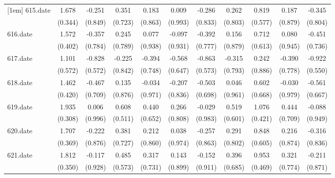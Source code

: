\begin{tabular}{l*{10}{c}}
[1em]
615.date    &       1.678&      -0.251&       0.351&       0.183&       0.009&      -0.286&       0.262&       0.819&       0.187&      -0.345\\
            &     (0.344)&     (0.849)&     (0.723)&     (0.863)&     (0.993)&     (0.833)&     (0.803)&     (0.577)&     (0.879)&     (0.804)\\
[1em]
616.date    &       1.572&      -0.357&       0.245&       0.077&      -0.097&      -0.392&       0.156&       0.712&       0.080&      -0.451\\
            &     (0.402)&     (0.784)&     (0.789)&     (0.938)&     (0.931)&     (0.777)&     (0.879)&     (0.613)&     (0.945)&     (0.736)\\
[1em]
617.date    &       1.101&      -0.828&      -0.225&      -0.394&      -0.568&      -0.863&      -0.315&       0.242&      -0.390&      -0.922\\
            &     (0.572)&     (0.572)&     (0.842)&     (0.748)&     (0.647)&     (0.573)&     (0.793)&     (0.886)&     (0.778)&     (0.550)\\
[1em]
618.date    &       1.462&      -0.467&       0.135&      -0.034&      -0.207&      -0.503&       0.046&       0.602&      -0.030&      -0.561\\
            &     (0.420)&     (0.709)&     (0.876)&     (0.971)&     (0.836)&     (0.698)&     (0.961)&     (0.668)&     (0.979)&     (0.667)\\
[1em]
619.date    &       1.935&       0.006&       0.608&       0.440&       0.266&      -0.029&       0.519&       1.076&       0.444&      -0.088\\
            &     (0.308)&     (0.996)&     (0.511)&     (0.652)&     (0.808)&     (0.983)&     (0.601)&     (0.421)&     (0.709)&     (0.949)\\
[1em]
620.date    &       1.707&      -0.222&       0.381&       0.212&       0.038&      -0.257&       0.291&       0.848&       0.216&      -0.316\\
            &     (0.369)&     (0.876)&     (0.727)&     (0.860)&     (0.974)&     (0.863)&     (0.802)&     (0.605)&     (0.874)&     (0.836)\\
[1em]
621.date    &       1.812&      -0.117&       0.485&       0.317&       0.143&      -0.152&       0.396&       0.953&       0.321&      -0.211\\
            &     (0.350)&     (0.928)&     (0.573)&     (0.731)&     (0.899)&     (0.911)&     (0.685)&     (0.469)&     (0.774)&     (0.871)\\

\end{tabular}
